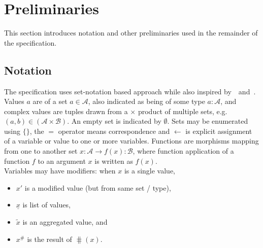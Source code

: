 \section{Preliminaries}\label{sec:prel}

This section introduces notation and other preliminaries used in the remainder
of the specification.

\subsection{Notation}

The specification uses set-notation based approach while also inspired
by~\cite{eutxo-2}~and~\cite{eutxo}. Values $a$ are of a set
$a \in \mathcal{A}$, also indicated as being of some type $a : \mathcal{A}$, and
complex values are tuples drawn from a $\times$ product of multiple sets, e.g.
$(a,b) \in (\mathcal{A} \times \mathcal{B})$. An empty set is indicated by
$\emptyset$. Sets may be enumerated using $\{\}$, the $=$ operator means
correspondence and $\gets$ is explicit assignment of a variable or value to one
or more variables. Functions are morphisms mapping from one to another set
$x : \mathcal{A} \to f(x) : \mathcal{B}$, where function
application of a function $f$ to an argument $x$ is written as $f(x)$. \\


\noindent Variables may have modifiers: when $x$ is a single value,
\begin{itemize}
  \item $x'$ is a modified value (but from same set / type),
  \item $\underline{x}$ is list of values,
  \item $\tilde{x}$ is an aggregated value, and
  \item $x^{\#}$ is the result of $\hash(x)$.
\end{itemize}

